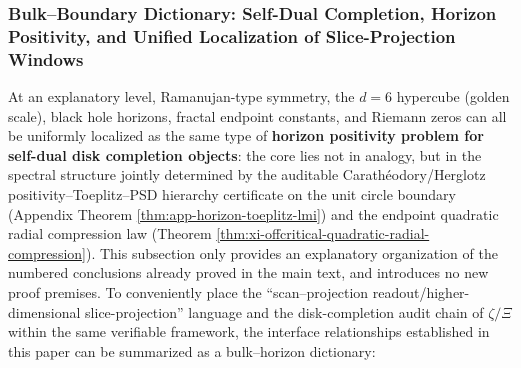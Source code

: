 \subsubsection{Bulk--Boundary Dictionary: Self-Dual Completion, Horizon Positivity, and Unified Localization of Slice-Projection Windows}\label{subsubsec:discussion-bulk-horizon-dictionary}
At an explanatory level, Ramanujan-type symmetry, the \(d=6\) hypercube (golden scale), black hole horizons, fractal endpoint constants, and Riemann zeros can all be uniformly localized as the same type of \textbf{horizon positivity problem for self-dual disk completion objects}: the core lies not in analogy, but in the spectral structure jointly determined by the auditable Carath\'eodory/Herglotz positivity--Toeplitz--PSD hierarchy certificate on the unit circle boundary (Appendix Theorem \ref{thm:app-horizon-toeplitz-lmi}) and the endpoint quadratic radial compression law (Theorem \ref{thm:xi-offcritical-quadratic-radial-compression}).
This subsection only provides an explanatory organization of the numbered conclusions already proved in the main text, and introduces no new proof premises. To conveniently place the ``scan--projection readout/higher-dimensional slice-projection'' language and the disk-completion audit chain of \(\zeta/\Xi\) within the same verifiable framework, the interface relationships established in this paper can be summarized as a bulk--horizon dictionary:
